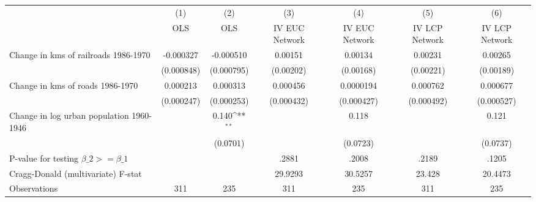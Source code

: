 {
\def\sym#1{\ifmmode^{#1}\else\(^{#1}\)\fi}
\begin{tabular}{l*{6}{c}}
\hline\hline
                &\multicolumn{1}{c}{(1)}&\multicolumn{1}{c}{(2)}&\multicolumn{1}{c}{(3)}&\multicolumn{1}{c}{(4)}&\multicolumn{1}{c}{(5)}&\multicolumn{1}{c}{(6)}\\
                &\multicolumn{1}{c}{OLS}&\multicolumn{1}{c}{OLS}&\multicolumn{1}{c}{IV EUC Network}&\multicolumn{1}{c}{IV EUC Network}&\multicolumn{1}{c}{IV LCP Network}&\multicolumn{1}{c}{IV LCP Network}\\
\hline
Change in kms of railroads 1986-1970&-0.000327         &-0.000510         &  0.00151         &  0.00134         &  0.00231         &  0.00265         \\
                &(0.000848)         &(0.000795)         &(0.00202)         &(0.00168)         &(0.00221)         &(0.00189)         \\
[1em]
Change in kms of roads 1986-1970& 0.000213         & 0.000313         & 0.000456         &0.0000194         & 0.000762         & 0.000677         \\
                &(0.000247)         &(0.000253)         &(0.000432)         &(0.000427)         &(0.000492)         &(0.000527)         \\
[1em]
Change in log urban population 1960-1946&                  &    0.140\sym{**} &                  &    0.118         &                  &    0.121         \\
                &                  & (0.0701)         &                  & (0.0723)         &                  & (0.0737)         \\
\hline
P-value for testing $\beta\_{2} >= \beta\_{1}$&                  &                  &    .2881         &    .2008         &    .2189         &    .1205         \\
Cragg-Donald (multivariate) F-stat&                  &                  &  29.9293         &  30.5257         &   23.428         &  20.4473         \\
Observations    &      311         &      235         &      311         &      235         &      311         &      235         \\
\hline\hline
\end{tabular}
}
